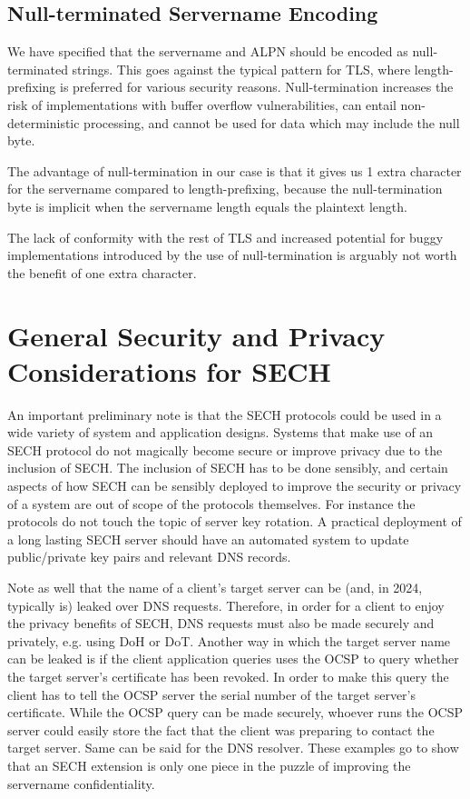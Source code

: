 \subsection{Null-terminated Servername Encoding}
We have specified that the servername and \ac{ALPN} should
be encoded as null-terminated strings.
This goes against the typical pattern for \ac{TLS},
where length-prefixing is preferred for various security reasons.
Null-termination increases the risk of implementations with
buffer overflow vulnerabilities, can entail
non-deterministic processing, and cannot be used
for data which may include the null byte.

The advantage of null-termination in our case is that it
gives us 1 extra character for the servername compared to
length-prefixing, because the null-termination byte
is implicit when the servername length equals the plaintext length.

The lack of conformity with the rest of \ac{TLS} and
increased potential for buggy implementations
introduced by the use of null-termination is arguably
not worth the benefit of one extra character.

\section{General Security and Privacy Considerations for SECH}

An important preliminary note is that the \ac{SECH}
protocols could be used in a wide variety of system and application designs.
Systems that make use of an \ac{SECH} protocol
do not magically become secure
or improve privacy due to the inclusion of \ac{SECH}.
The inclusion of \ac{SECH} has to be done sensibly,
and certain aspects of how SECH can be sensibly
deployed to improve the security or privacy
of a system are out of scope of the protocols themselves.
For instance the protocols do not touch the topic of server key rotation.
A practical deployment of a long lasting \ac{SECH} server
should have an automated system
to update public/private key pairs
and relevant \ac{DNS} records.

Note as well that the name of a client’s target server can be (and, in 2024, typically is) leaked over \ac{DNS} requests.
Therefore, in order for a client to enjoy the privacy benefits of \ac{SECH},
DNS requests must also be made securely and privately, e.g. using \ac{DoH} or \ac{DoT}.
Another way in which the target server name can be leaked is if the client application queries uses the \ac{OCSP} to query whether the target server’s certificate has been revoked.
In order to make this query the client has to tell the \ac{OCSP} server the serial number of the target server’s certificate.
While the \ac{OCSP} query can be made securely, whoever runs the \ac{OCSP} server could easily store the fact that the client was preparing to contact the target server.
Same can be said for the \ac{DNS} resolver.
These examples go to show that an \ac{SECH} extension
is only one piece in the puzzle
of improving the servername confidentiality.


